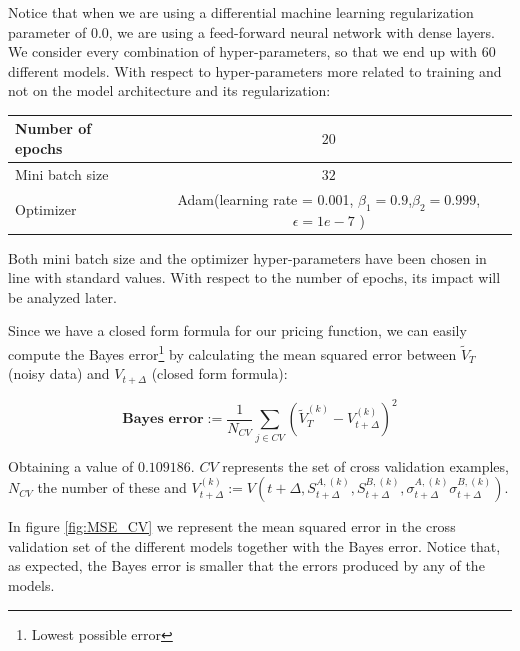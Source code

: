 Notice that when we are using a differential machine learning regularization parameter of 0.0, we are using a feed-forward neural network with dense layers. We consider every combination of hyper-parameters, so that we end up with $60$ different models. With respect to hyper-parameters more related to training and not on the model architecture and its regularization:


\begin{center}
\begin{tabular}{||l | c||} 
 \hline
 Number of epochs & $20$ \\
 \hline
 Mini batch size  & $32$  \\
 \hline
 Optimizer &  Adam(learning rate = 0.001, $\beta_1=0.9$,$\beta_2=0.999$,$\epsilon=1e-7$ ) \\
  \hline
 \end{tabular}
\end{center}
Both mini batch size and the optimizer hyper-parameters have been chosen in line with standard values. With respect to the number of epochs, its impact will be analyzed later. 

Since we have a closed form formula for our pricing function, we can easily compute the Bayes error\footnote{Lowest possible error} by calculating the mean squared error between $\tilde{V}_{T}$ (noisy data) and $V_{t+\Delta}$ (closed form formula):

$$\textbf{Bayes error}:=\frac{1}{N_{CV}}\sum_{j\in CV}\left(\tilde{V}_{T}^{(k)}-V_{t+\Delta}^{(k)}\right)^2$$

Obtaining a value of $0.109186$. $CV$ represents the set of cross validation examples, $N_{CV}$ the number of these and $V_{t+\Delta}^{(k)} := V\left(t+\Delta, S_{t+\Delta}^{A,(k)}
,S_{t+\Delta}^{B,(k)}
,\sigma_{t+\Delta}^{A,(k)}
\sigma_{t+\Delta}^{B,(k)}\right)$.

In figure \ref{fig:MSE_CV} we represent the mean squared error in the cross validation set of the different models together with the Bayes error. Notice that, as expected, the Bayes error is smaller that the errors produced by any of the models.


